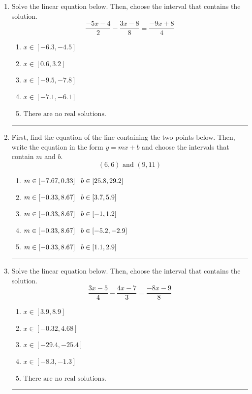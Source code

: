 \documentclass[14pt]{extbook}
\newcommand{\litem}[1]{\item#1\hspace*{-1cm}\rule{\textwidth}{0.4pt}}
\begin{document}
\begin{enumerate}
{\begin{enumerate}[label=\Alph*.]
\end{enumerate} }
\litem{
Solve the linear equation below. Then, choose the interval that contains the solution.\[ \frac{-5x -4}{2} - \frac{3x -8}{8} = \frac{-9x + 8}{4} \]\begin{enumerate}[label=\Alph*.]
\item \( x \in [-6.3, -4.5] \)
\item \( x \in [0.6, 3.2] \)
\item \( x \in [-9.5, -7.8] \)
\item \( x \in [-7.1, -6.1] \)
\item \( \text{There are no real solutions.} \)

\end{enumerate} }
\litem{
First, find the equation of the line containing the two points below. Then, write the equation in the form $ y=mx+b $ and choose the intervals that contain $m$ and $b$.\[ (6, 6) \text{ and } (9, 11) \]\begin{enumerate}[label=\Alph*.]
\item \( m \in [-7.67, 0.33] \hspace*{3mm} b \in [25.8, 29.2] \)
\item \( m \in [-0.33, 8.67] \hspace*{3mm} b \in [3.7, 5.9] \)
\item \( m \in [-0.33, 8.67] \hspace*{3mm} b \in [-1, 1.2] \)
\item \( m \in [-0.33, 8.67] \hspace*{3mm} b \in [-5.2, -2.9] \)
\item \( m \in [-0.33, 8.67] \hspace*{3mm} b \in [1.1, 2.9] \)

\end{enumerate} }
\litem{
Solve the linear equation below. Then, choose the interval that contains the solution.\[ \frac{3x -5}{4} - \frac{4x -7}{3} = \frac{-8x -9}{8} \]\begin{enumerate}[label=\Alph*.]
\item \( x \in [3.9, 8.9] \)
\item \( x \in [-0.32, 4.68] \)
\item \( x \in [-29.4, -25.4] \)
\item \( x \in [-8.3, -1.3] \)
\item \( \text{There are no real solutions.} \)


\end{enumerate}}
\end{enumerate}
\end{document}
